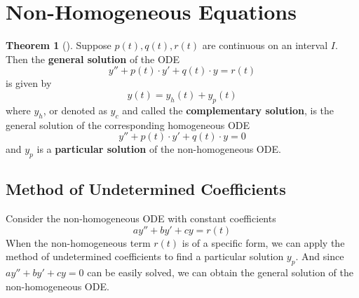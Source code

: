 \documentclass[10pt,UTF8]{article}
\newenvironment{theoremBox}
{
  \begin{tcolorbox}[colback=yellow!5!white,colframe=yellow!75!black,parbox=false,before
  upper=\par,before lower=\par]}
  {
\end{tcolorbox}}
\theoremstyle{definition}
\newtheorem{definition inner}{Definition}[section]
\theoremstyle{definition}
\newtheorem{theorem inner}{Theorem}[section]
\newenvironment{theorem}[1][]
{
  \begin{theoremBox}
  \begin{theorem inner}[#1]\hfill\par}
    {
    \end{theorem inner}
\end{theoremBox}}
\theoremstyle{definition}
\newtheorem*{proof inner}{\textit{Proof}}
\theoremstyle{plain}
\newtheorem{tip inner}{Tip}[section]
\theoremstyle{remark}
\begin{document}
\section{Non-Homogeneous Equations}

\begin{theorem}
  {}\label{thm: general solution of non-homogeneous ODE}
  Suppose \(p(t), q(t), r(t)\) are continuous on an interval \(I\).
  Then the \textbf{general solution} of the ODE
  \begin{equation*}
    y'' + p(t)\cdot y' + q(t)\cdot y = r(t)
  \end{equation*}
  is given by
  \begin{equation*}
    y(t) = y_h(t) + y_p(t)
  \end{equation*}
  where \(y_h\), or denoted as \(y_c\) and called
  the \textbf{complementary solution},
  is the general solution of the corresponding homogeneous ODE
  \begin{equation*}
    y'' + p(t)\cdot y' + q(t)\cdot y = 0
  \end{equation*}
  and \(y_p\) is a \textbf{particular solution} of the non-homogeneous ODE\@.
\end{theorem}


\subsection{Method of Undetermined Coefficients}

Consider the non-homogeneous ODE with constant coefficients
\begin{equation*}
  a y'' + b y' + c y = r(t)
\end{equation*}
When the non-homogeneous term \(r(t)\) is of a specific form,
we can apply the method of undetermined coefficients to find
a particular solution \(y_p\).
And since \(a y'' + b y' + c y = 0\) can be easily solved,
we can obtain the general solution of the non-homogeneous ODE\@.
\end{document}
